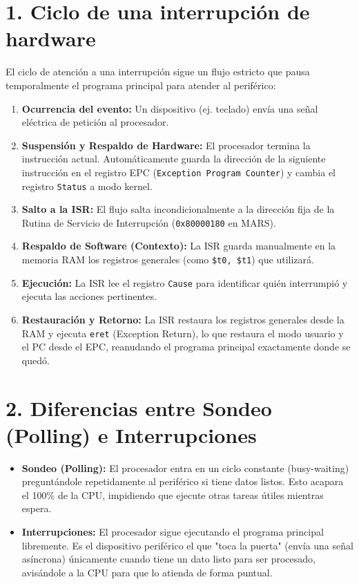 \documentclass[12pt,a4paper]{article}
\begin{document}
\section*{1. Ciclo de una interrupción de hardware}
El ciclo de atención a una interrupción sigue un flujo estricto que pausa temporalmente el programa principal para atender al periférico:
\begin{enumerate}
    \item \textbf{Ocurrencia del evento:} Un dispositivo (ej. teclado) envía una señal eléctrica de petición al procesador.
    \item \textbf{Suspensión y Respaldo de Hardware:} El procesador termina la instrucción actual. Automáticamente guarda la dirección de la siguiente instrucción en el registro EPC (\texttt{Exception Program Counter}) y cambia el registro \texttt{Status} a modo kernel.
    \item \textbf{Salto a la ISR:} El flujo salta incondicionalmente a la dirección fija de la Rutina de Servicio de Interrupción (\texttt{0x80000180} en MARS).
    \item \textbf{Respaldo de Software (Contexto):} La ISR guarda manualmente en la memoria RAM los registros generales (como \texttt{\$t0, \$t1}) que utilizará.
    \item \textbf{Ejecución:} La ISR lee el registro \texttt{Cause} para identificar quién interrumpió y ejecuta las acciones pertinentes.
    \item \textbf{Restauración y Retorno:} La ISR restaura los registros generales desde la RAM y ejecuta \texttt{eret} (Exception Return), lo que restaura el modo usuario y el PC desde el EPC, reanudando el programa principal exactamente donde se quedó.
\end{enumerate}

\section*{2. Diferencias entre Sondeo (Polling) e Interrupciones}
\begin{itemize}
    \item \textbf{Sondeo (Polling):} El procesador entra en un ciclo constante (busy-waiting) preguntándole repetidamente al periférico si tiene datos listos. Esto acapara el 100\% de la CPU, impidiendo que ejecute otras tareas útiles mientras espera.
    \item \textbf{Interrupciones:} El procesador sigue ejecutando el programa principal libremente. Es el dispositivo periférico el que "toca la puerta" (envía una señal asíncrona) únicamente cuando tiene un dato listo para ser procesado, avisándole a la CPU para que lo atienda de forma puntual.
\end{itemize}
\end{document}
